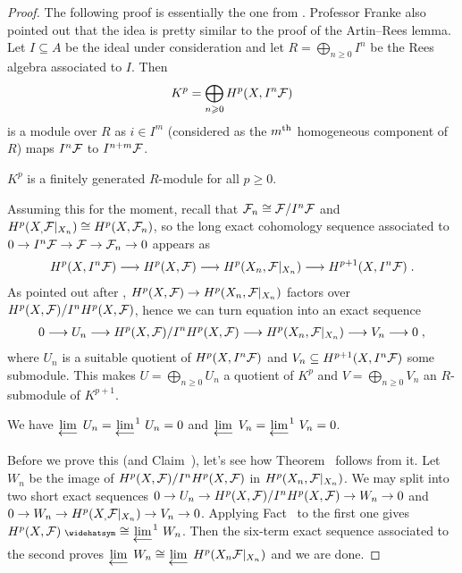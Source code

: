 \documentclass[a4paper,parskip=half,numbers=enddot, DIV=12]{scrreprt}
\renewcommand{\geq}{\geqslant}
\begin{document}
\begin{proof}
	The following proof is essentially the one from \cite[(4.1.7)]{egaIII}. Professor Franke also pointed out that the idea is pretty similar to the proof of the Artin--Rees lemma. Let $I\subseteq A$ be the ideal under consideration and let $R=\bigoplus_{n\geq 0}I^n$ be the Rees algebra associated to $I$. Then
	\begin{align*}
		K^p=\bigoplus_{n\geq 0}H^p(X,I^n\Ff)
	\end{align*}
	is a module over $R$ as $i\in I^m$ (considered as the $m^{\text{th}}$ homogeneous component of $R$) maps $I^n\mathcal{F}$ to $I^{n+m}\mathcal{F}$.
	\begin{claim}
		$K^p$ is a finitely generated $R$-module for all $p\geq 0$.
	\end{claim}
	Assuming this for the moment, recall that $\mathcal{F}_n\cong \mathcal{F}/I^n\mathcal{F}$ and $H^p(X_,\mathcal{F}|_{X_n})\cong H^p(X,\mathcal{F}_n)$, so the long exact cohomology sequence associated to $0\morphism I^n\Ff\morphism \Ff\morphism \Ff_n\morphism 0$ appears as
	\begin{align}\lbl{eq:FFSeq1}
		H^p(X,I^n\Ff)\morphism H^p(X,\Ff)\morphism H^p(X_n,\Ff|_{X_n})\morphism H^{p+1}(X,I^n\Ff)\;.
	\end{align}
	As pointed out after , $H^p(X,\Ff)\morphism H^p(X_n,\Ff|_{X_n})$ factors over $H^p(X,\mathcal{F})/I^nH^p(X,\mathcal{F})$, hence we can turn equation  into an exact sequence
	\begin{align}\lbl{eq:FFSeq2}
		0\morphism U_n\morphism H^p(X,\Ff)/I^nH^p(X,\Ff)\morphism H^p(X_n,\Ff|_{X_n})\morphism V_n\morphism 0\;,
	\end{align}
	where $U_n$ is a suitable quotient of $H^p(X,I^n\mathcal{F})$ and $V_n\subseteq H^{p+1}(X,I^n\mathcal{F})$ some submodule. This makes $U=\bigoplus_{n\geq 0}U_n$ a quotient of $K^p$ and $V=\bigoplus_{n\geq 0}V_n$ an $R$-submodule of $K^{p+1}$.
	\begin{claim}
		We have $\limit U_n=\limit[][^1]U_n=0$ and $\limit V_n=\limit[][^1]V_n=0$.
	\end{claim}
	Before we prove this (and Claim~), let's see how Theorem~ follows from it. Let $W_n$ be the image of $H^p(X,\mathcal{F})/I^nH^p(X,\mathcal{F})$ in $H^p(X_n,\mathcal{F}|_{X_n})$. We may split  into two short exact sequences $0\morphism U_n\morphism H^p(X,\Ff)/I^nH^p(X,\Ff)\morphism W_n\morphism 0$ and $0\morphism W_n\morphism H^p(X_,\Ff|_{X_n})\morphism V_n\morphism 0$. Applying Fact~ to the first one gives $H^p(X,\Ff)^\complete\cong \limit[][^1]W_n$. Then the six-term exact sequence associated to the second proves $\limit W_n\cong \limit H^p(X_n\Ff|_{X_n})$ and we are done.
	

\end{proof}
\end{document}

